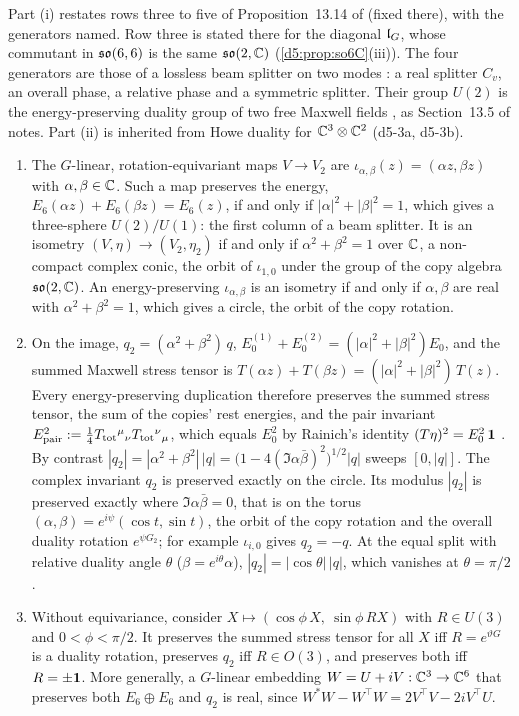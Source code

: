 Part (i) restates rows three to five of Proposition~13.14 of \cite{ES17} (fixed there), with the generators named. Row three is stated there for the diagonal $\mathfrak l_G$, whose commutant in $\mathfrak{so}(6,6)$ is the same $\mathfrak{so}(2,\mathbb{C})$ (\cref{d5:prop:so6C}(iii)). The four generators are
those of a lossless beam splitter on two modes \cite{CamposSalehTeich89}: a real splitter $C_v$, an overall phase, a relative phase and a
symmetric splitter. Their group $U(2)$ is the energy-preserving duality group of two free Maxwell fields \cite{GaillardZumino81}, as
Section~13.5 of \cite{ES17} notes. Part (ii) is inherited from Howe duality for $\mathbb{C}^3\otimes\mathbb{C}^2$ \cite{Howe89} (d5-3a, d5-3b).

\begin{theorem}
\label{d5:thm:dup}
\begin{enumerate}[label=(\roman*),leftmargin=2.2em]
\item The $G$-linear, rotation-equivariant maps $V\to V_2$ are $\iota_{\alpha,\beta}(z)=(\alpha z,\beta z)$ with $\alpha,\beta\in\mathbb{C}$. Such a map preserves
the energy, $E_6(\alpha z)+E_6(\beta z)=E_6(z)$, if and only if $|\alpha|^2+|\beta|^2=1$, which gives a three-sphere $U(2)/U(1)$: the first column of
a beam splitter. It is an isometry $(V,\eta)\to(V_2,\eta_2)$ if and only if $\alpha^2+\beta^2=1$ over $\mathbb{C}$, a non-compact complex conic, the orbit
of $\iota_{1,0}$ under the group of the copy algebra $\mathfrak{so}(2,\mathbb{C})$. An energy-preserving $\iota_{\alpha,\beta}$ is an isometry if and only if
$\alpha,\beta$ are real with $\alpha^2+\beta^2=1$, which gives a circle, the orbit of the copy rotation.
\item On the image, $q_2=(\alpha^2+\beta^2)\,q$, $E_0^{(1)}+E_0^{(2)}=(|\alpha|^2+|\beta|^2)E_0$, and the summed Maxwell stress tensor is
$T(\alpha z)+T(\beta z)=(|\alpha|^2+|\beta|^2)\,T(z)$. Every energy-preserving duplication therefore preserves the summed stress tensor, the sum
of the copies' rest energies, and the pair invariant $E_{\rm pair}^2:=\tfrac14T_{\rm tot}{}^\mu{}_\nu T_{\rm tot}{}^\nu{}_\mu$, which equals $E_0^2$ by
Rainich's identity $(T\eta)^2=E_0^2\,\mathbf 1$ \cite{Rainich1925}. By contrast $|q_2|=|\alpha^2+\beta^2|\,|q|=\bigl(1-4(\Im\alpha\bar\beta)^2\bigr)^{1/2}|q|$ sweeps $[0,|q|]$. The complex invariant $q_2$ is preserved exactly on
the circle. Its modulus $|q_2|$ is preserved exactly where $\Im\alpha\bar\beta=0$, that is on the torus $(\alpha,\beta)=e^{i\psi}(\cos t,\sin t)$, the orbit of the copy
rotation and the overall duality rotation $e^{\psi G_2}$; for example $\iota_{i,0}$ gives $q_2=-q$. At the equal split with relative duality angle $\theta$ ($\beta=e^{i\theta}\alpha$), $|q_2|=|\cos\theta|\,|q|$, which vanishes at
$\theta=\pi/2$.
\item Without equivariance, consider $X\mapsto(\cos\phi\,X,\ \sin\phi\,RX)$ with $R\in U(3)$ and $0<\phi<\pi/2$. It preserves the summed stress tensor
for all $X$ iff $R=e^{\vartheta G}$ is a duality rotation, preserves $q_2$ iff $R\in O(3)$, and preserves both iff $R=\pm\mathbf 1$. More generally,
a $G$-linear embedding $W=U+iV:\mathbb{C}^3\to\mathbb{C}^6$ that preserves both $E_6\oplus E_6$ and $q_2$ is real, since
$W^*W-W^{\!\top}W=2V^{\!\top}V-2iV^{\!\top}U$.
\end{enumerate}
\end{theorem}

